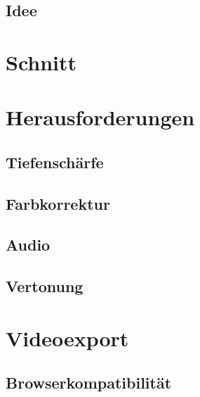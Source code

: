 \subsection{Idee}
\renewcommand{\kapitelautor}{Autor: Kerstin Schön}

\section{Schnitt}
\renewcommand{\kapitelautor}{Autor: Kerstin Schön}

\section{Herausforderungen}
\renewcommand{\kapitelautor}{Autor: Kerstin Schön}
\subsection{Tiefenschärfe}
\renewcommand{\kapitelautor}{Autor: Kerstin Schön}
\subsection{Farbkorrektur}
\renewcommand{\kapitelautor}{Autor: Kerstin Schön}
\subsection{Audio}
\renewcommand{\kapitelautor}{Autor: Kerstin Schön}
\subsection{Vertonung}
\renewcommand{\kapitelautor}{Autor: Kerstin Schön}

\section{Videoexport}
\renewcommand{\kapitelautor}{Autor: Kerstin Schön}
\subsection{Browserkompatibilität}
\renewcommand{\kapitelautor}{Autor: Kerstin Schön}
